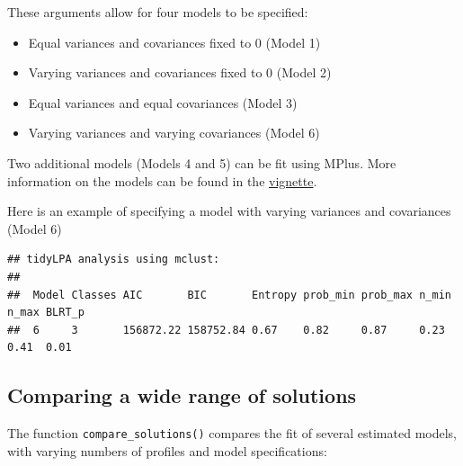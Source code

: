\documentclass[man]{apa6}
\providecommand{\tightlist}{%
  \setlength{\itemsep}{0pt}\setlength{\parskip}{0pt}}
\begin{document}
These arguments allow for four models to be specified:

\begin{itemize}
\tightlist
\item
  Equal variances and covariances fixed to 0 (Model 1)
\item
  Varying variances and covariances fixed to 0 (Model 2)
\item
  Equal variances and equal covariances (Model 3)
\item
  Varying variances and varying covariances (Model 6)
\end{itemize}

Two additional models (Models 4 and 5) can be fit using MPlus. More information
on the models can be found in the
\href{https://data-edu.github.io/tidyLPA/articles/Introduction_to_tidyLPA.html}{vignette}.

Here is an example of specifying a model with varying variances and covariances
(Model 6)

\begin{verbatim}
## tidyLPA analysis using mclust: 
## 
##  Model Classes AIC       BIC       Entropy prob_min prob_max n_min n_max BLRT_p
##  6     3       156872.22 158752.84 0.67    0.82     0.87     0.23  0.41  0.01
\end{verbatim}

\hypertarget{comparing-a-wide-range-of-solutions}{%
\subsection{Comparing a wide range of solutions}\label{comparing-a-wide-range-of-solutions}}

The function \texttt{compare\_solutions()} compares the fit of several estimated models,
with varying numbers of profiles and model specifications:
\end{document}
